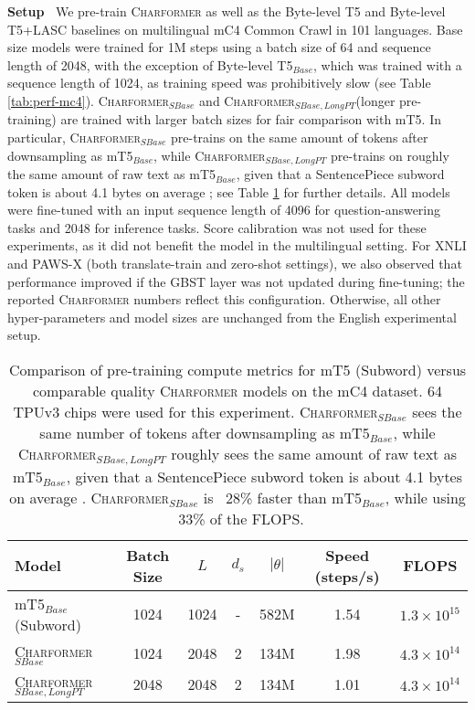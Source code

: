 \documentclass{article} \usepackage{iclr2022_conference,times}
\newcommand{\charformer}{\textsc{Charformer}\xspace}
\newcommand{\charformertall}{\textsc{Charformer}$_{SBase}$\xspace}
\newcommand{\charformertalllong}{\textsc{Charformer}$_{SBase,LongPT}$\xspace}
\newcommand{\byte}{Byte-level T5\xspace}
\newcommand{\bytebase}{Byte-level T5$_{Base}$\xspace}
\newcommand{\canine}{Byte-level T5+LASC\xspace}
\begin{document}
\noindent \textbf{Setup} $\:$ We pre-train \charformer as well as the \byte and \canine baselines on multilingual mC4 Common Crawl \citep{xue2020mt5} in 101 languages. Base size models were trained for 1M steps using a batch size of 64 and sequence length of 2048, with the exception of \bytebase, which was trained with a sequence length of 1024, as training speed was prohibitively slow (see Table \ref{tab:perf-mc4}). \charformertall and \charformertalllong (longer pre-training) are trained with larger batch sizes for fair comparison with mT5. In particular, \charformertall pre-trains on the same amount of tokens after downsampling as mT5$_{Base}$, while \charformertalllong pre-trains on roughly the same amount of raw text as mT5$_{Base}$, given that a SentencePiece subword token is about 4.1 bytes on average \citep{Xue2021byt5}; see Table \ref{tab:perfmc4} for further details. All models were fine-tuned with an input sequence length of 4096 for question-answering tasks and 2048 for inference tasks. Score calibration was not used for these experiments, as it did not benefit the model in the multilingual setting. For XNLI and PAWS-X (both translate-train and zero-shot settings), we also observed that performance improved if the GBST layer was not updated during fine-tuning; the reported \charformer numbers reflect this configuration. Otherwise, all other hyper-parameters and model sizes are unchanged from the English experimental setup.

\begin{table} \small
    \centering
    \caption{Comparison of pre-training compute metrics for mT5 (Subword) versus comparable quality \charformer models on the mC4 dataset. 64 TPUv3 chips were used for this experiment. \charformertall sees the same number of tokens after downsampling as mT5$_{Base}$, while \charformertalllong roughly sees the same amount of raw text as mT5$_{Base}$, given that a SentencePiece subword token is about 4.1 bytes on average \citep{Xue2021byt5}. \charformertall is ~28\% faster than mT5$_{Base}$, while using ~33\% of the FLOPS.}
    \label{tab:perfmc4}
    \begin{tabular}{l c c c ccc}
    \toprule 
     Model & Batch Size & $L$ & $d_s$ & $|\theta|$  & Speed (steps/s) & FLOPS \\
     \midrule
     mT5$_{Base}$ (Subword) & 1024 & 1024 & - & 582M & 1.54 & $1.3 \times 10^{15}$ \\
      \charformertall & 1024 & 2048 & 2 & 134M & 1.98 & $4.3 \times 10^{14}$\\
      \charformertalllong & 2048 & 2048 & 2 & 134M & 1.01 & $4.3 \times 10^{14}$\\
      \bottomrule
    \end{tabular}
\end{table}
\end{document}
